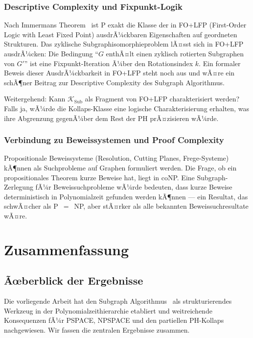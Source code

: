 ﻿\documentclass[a4paper,12pt]{article}
\theoremstyle{definition}
\begin{document}
\subsubsection{Descriptive Complexity und Fixpunkt-Logik}

Nach Immermans Theorem~\cite{immerman1999descriptive} ist P exakt die Klasse
der in FO+LFP (First-Order Logic with Least Fixed Point) ausdrÃ¼ckbaren
Eigenschaften auf geordneten Strukturen.
Das zyklische Subgraphisomorphieproblem lÃ¤sst sich in FO+LFP ausdrÃ¼cken:
Die Bedingung ``$G$ enthÃ¤lt einen zyklisch rotierten Subgraphen von $G'$''
ist eine Fixpunkt-Iteration Ã¼ber den Rotationsindex $k$.
Ein formaler Beweis dieser AusdrÃ¼ckbarkeit in FO+LFP steht noch aus und wÃ¤re
ein schÃ¶ner Beitrag zur Descriptive Complexity des Subgraph Algorithmus.

Weitergehend: Kann $\mathcal{K}_\mathrm{Sub}$ als Fragment von FO+LFP charakterisiert
werden? Falls ja, wÃ¼rde die Kollaps-Klasse eine logische Charakterisierung erhalten,
was ihre Abgrenzung gegenÃ¼ber dem Rest der PH prÃ¤zisieren wÃ¼rde.

\subsubsection{Verbindung zu Beweissystemen und Proof Complexity}

Propositionale Beweissysteme (Resolution, Cutting Planes, Frege-Systeme)
kÃ¶nnen als Suchprobleme auf Graphen formuliert werden.
Die Frage, ob ein propositionales Theorem kurze Beweise hat, liegt in coNP.
Eine Subgraph-Zerlegung fÃ¼r Beweissuchprobleme wÃ¼rde bedeuten, dass kurze Beweise
deterministisch in Polynomialzeit gefunden werden kÃ¶nnen --- ein Resultat,
das schwÃ¤cher als P~$=$~NP, aber stÃ¤rker als alle bekannten Beweissuchresultate wÃ¤re.

\section{Zusammenfassung}
\label{sec:zusammenfassung}

\subsection{Ãœberblick der Ergebnisse}

Die vorliegende Arbeit hat den Subgraph Algorithmus~\cite{epp2026subgraph}
als strukturierendes Werkzeug in der Polynomialzeithierarchie etabliert
und weitreichende Konsequenzen fÃ¼r PSPACE, NPSPACE und den partiellen
PH-Kollaps nachgewiesen. Wir fassen die zentralen Ergebnisse zusammen.
\end{document}
